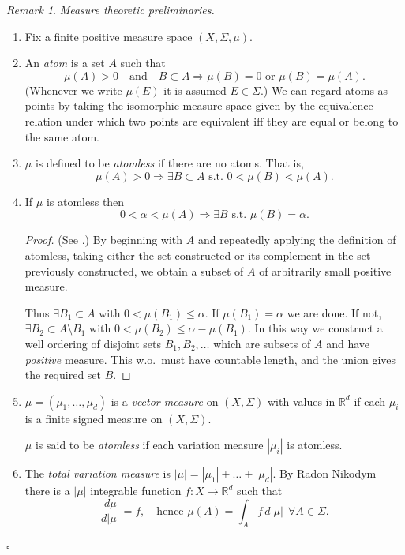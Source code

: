 \documentclass[a4paper]{amsart}
\theoremstyle{plain}
\theoremstyle{definition}
\theoremstyle{remark}
\newtheorem{remark}[theorem]{Remark}
\begin{document}
\begin{remark} \emph{Measure theoretic preliminaries.}   \label{mtp}
\begin{enumerate}
\item Fix a finite positive measure space $ (X, \Sigma, \mu) $. 

 \item An \emph{atom} is a set $ A $ such that 
 \[ \mu(A) > 0\quad  \text{and} \quad  B\subset A \Longrightarrow \mu(B) = 0 \text{ or } \mu(B) =\mu(A).
 \]
  (Whenever we write $ \mu(E) $ it is assumed $ E \in \Sigma $.) We can regard atoms as points by taking the isomorphic measure space given by the equivalence relation under which two points are equivalent iff they are equal or belong to the same atom.

 
\item $ \mu $ is defined to be \emph{atomless} if there are no atoms. That is,
\[
 \mu(A) > 0 \Longrightarrow \exists B\subset A \text{ s.t.\ } 0 < \mu(B) < \mu(A).
 \]
 
 \item If $ \mu $ is atomless then
 \[
 0 < \alpha < \mu(A) \Longrightarrow \exists B \text{ s.t.\ } \mu(B) = \alpha .
 \]
\begin{proof} (See \cite{Hal}.)  By beginning with $ A $ and repeatedly applying the definition of atomless,   taking either the set constructed or its complement in the set previously constructed, we obtain a subset of $ A $ of arbitrarily small positive measure.

Thus   $\exists B_1\subset  A $ with $ 0 < \mu(B_1) \leq \alpha $.   If $   \mu(B_1) = \alpha $ we are done.  If not, $\exists  B_2 \subset A \setminus B_1 $ with $0<  \mu(B_2) \leq  \alpha - \mu(B_1) $. In this way we construct a well ordering of disjoint sets $ B_1, B_2 , \dots $  which are subsets of $ A $ and have \emph{positive} measure.  This w.o.\ must have countable length, and the union gives the required set $ B $.
 \end{proof}  
 
 \item $ \mu = (\mu_1, \dots, \mu_d) $ is a \emph{vector measure} on $ (X,\Sigma) $ with values in $ \mathbb{R}^d  $ if each $ \mu_i $ is a finite signed measure on $ (X,\Sigma) $.
 
 $ \mu $ is said to be \emph{atomless} if each variation measure $ |\mu_i | $ is atomless.
 
 \item The \emph{total variation measure} is $ |\mu| = |\mu_1| + \dots + | \mu_d| $.
  By Radon Nikodym there is a $ |\mu| $ integrable function $ f : X \to \mathbb{R}^d  $ such that 
 \begin{equation} \label{}
\frac{d\mu }{d |\mu| } = f , \quad  \text{hence } \mu(A) = \int_A f \, d|\mu| \ \ \forall A \in \Sigma.
 \end{equation}
 \end{enumerate} 
  \hfill $\square$  \end{remark} 
\end{document}
